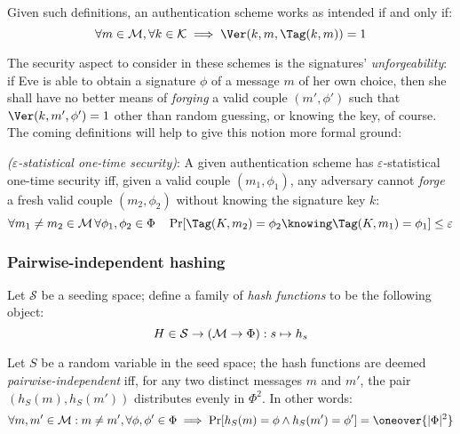 Given such definitions, an authentication scheme works as intended if and only if:
\[
    \forall m \in \M, \forall k \in \K \implies \Ver(k, m, \Tag(k, m)) = 1
\]

The security aspect to consider in these schemes is the signatures' \emph{unforgeability}: if Eve is able to obtain a signature $\phi$ of a message $m$ of her own choice, then she shall have no better means of \emph{forging} a valid couple $(m', \phi')$ such that $\Ver(k, m', \phi') = 1$ other than random guessing, or knowing the key, of course. The coming definitions will help to give this notion more formal ground:

\begin{definition} \emph{($\varepsilon$-statistical one-time security)}:
    A given authentication scheme has $\varepsilon$-statistical one-time security iff, given a valid couple $(m_1, \phi_1)$, any adversary cannot \emph{forge} a fresh valid couple $(m_2, \phi_2)$ without knowing the signature key $k$:
    \[
        \forall m_1 \neq m_2 \in \M \, \forall \phi_1, \phi_2 \in \Phi \quad \Pr[\Tag(K, m_2) = \phi_2 \knowing \Tag(K, m_1) = \phi_1] \leq \varepsilon
    \]
\end{definition}

\subsubsection{Pairwise-independent hashing}

\begin{definition}
    Let $\mathcal{S}$ be a seeding space; define a family of \emph{hash functions} to be the following object\footnotemark:
    \[
        H \in \mathcal{S} \to (\mathcal{M} \to \Phi) : s \mapsto h_s
    \]


    Let $S$ be a random variable in the seed space; the hash functions are deemed \emph{pairwise-independent}\footnotemark{} iff, for any two distinct messages $m$ and $m'$, the pair $(h_S(m), h_S(m'))$ distributes evenly in $\Phi^2$. In other words:
    \[
        \forall m, m' \in \M : m \neq m', \forall \phi, \phi' \in \Phi \implies \Pr[h_S(m) = \phi \wedge h_S(m') = \phi'] = \oneover{|\Phi|^2}
    \]
\end{definition}


